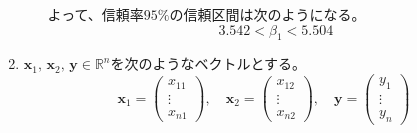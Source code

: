 \documentclass[12pt,b5paper]{ltjsarticle}
\begin{document}
\begin{enumerate}
\begin{enumerate}
            よって、信頼率$95\%$の信頼区間は次のようになる。
            \begin{equation}
             3.542 < \beta_1 < 5.504
            \end{equation}

      \end{enumerate}

      \hrulefill

 \item
      $\bm{x}_1,\,\bm{x}_2,\,\bm{y}\in\mathbb{R}^n$を次のようなベクトルとする。
      \begin{equation}
       \bm{x}_1=\begin{pmatrix}x_{11}\\ \vdots \\ x_{n1}\end{pmatrix},\quad
       \bm{x}_2=\begin{pmatrix}x_{12}\\ \vdots \\ x_{n2}\end{pmatrix},\quad
       \bm{y}=\begin{pmatrix}y_{1}\\ \vdots \\ y_{n}\end{pmatrix}
      \end{equation}


\end{enumerate}
\end{document}

